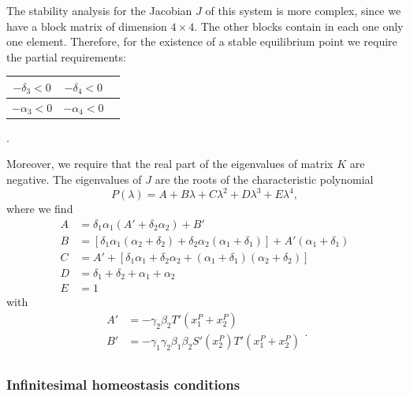 The stability analysis for the Jacobian $J$ of this system is more 
complex, since we have a block matrix of dimension $4 \times 4$. 
The other blocks contain in each one only one element.
Therefore, for the existence of a stable equilibrium point we 
require the partial requirements:
{
    \setlength{\tabcolsep}{10pt}
    \renewcommand{\arraystretch}{3.0}
\begin{table}[H]
    \centering
    \begin{tabular}{|c|c|c|}
        \hline
        $-\delta_3 < 0$ & $-\delta_4 < 0$  \\
        \hline
        $-\alpha_3 < 0$ & $-\alpha_4 < 0$ \\
        \hline
    \end{tabular}.
\end{table}
}
Moreover, we require that the real part of the eigenvalues of 
matrix $K$ are negative. The eigenvalues of $J$ are the roots
of the characteristic polynomial
\begin{equation}
    P(\lambda) = A + B\lambda + C\lambda^2 + D\lambda^3 + E\lambda^4,
\end{equation}
where we find
\begin{equation}
    \begin{aligned}
        A &= \delta_1 \alpha_1 (A' + \delta_2 \alpha_2) + B'\\
        B &= [\delta_1 \alpha_1(\alpha_2 + \delta_2) + \delta_2 \alpha_2(\alpha_1 + \delta_1)]
        + A'(\alpha_1 + \delta_1)\\
        C &= A' + [\delta_1 \alpha_1 + \delta_2 \alpha_2 + (\alpha_1 + \delta_1)(\alpha_2 + \delta_2)]\\
        D &= \delta_1 + \delta_2 + \alpha_1 + \alpha_2\\
        E & = 1
    \end{aligned}
\end{equation}
with 
\begin{equation}
    \begin{aligned}
        A' &= -\gamma_2 \beta_2 T'(x_1^P + x_2^P) \\
        B' &= -\gamma_1 \gamma_2 \beta_1 \beta_2 S'(x_2^P)T'(x_1^P + x_2^P)\\
    \end{aligned}.
\end{equation}

\subsubsection{Infinitesimal homeostasis conditions}

